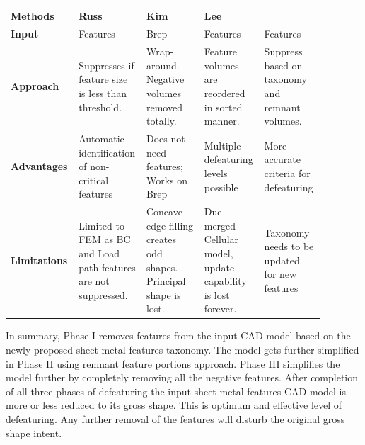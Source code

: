\bigskip
\begin{minipage}[t]{0.9\linewidth}
  \centering
  \label{tbl:defeaturing:benchmarking}
\begin{longtable}[htp]{@{} p{0.16\linewidth} |p{0.18\linewidth} | p{0.18\linewidth}| p{0.18\linewidth} |p{0.18\linewidth}@{}}
\toprule
\textbf{Methods} & \textbf{Russ~\cite{Russ2012}} &	\textbf{Kim~\cite{Kim2005}} &	\textbf{Lee~\cite{Lee2005}} & \textbf{\mysystemname}\\
\midrule
\textbf{Input} & Features	& Brep	& Features	& Features\\
\midrule
\textbf{Approach} & Suppresses if feature size is less than threshold.&
Wrap-around. Negative volumes removed totally. &
Feature volumes are reordered in sorted manner.&
Suppress based on taxonomy and remnant volumes.\\
\midrule
\textbf{Advantages} & Automatic identification of non-critical features &
 Does not need features; Works on Brep&
 Multiple defeaturing levels possible& More accurate criteria for defeaturing
\\
\midrule
\textbf{Limitations} & Limited to FEM as BC and Load path features are not suppressed. &
Concave edge filling creates odd shapes. Principal shape is lost. &
Due merged Cellular model, update capability is lost forever. &
Taxonomy needs to be updated for new features\\	
\bottomrule
\end{longtable}

\end{minipage}


\bigskip


In summary, Phase I removes features from the input CAD model based on the newly proposed sheet metal features taxonomy. The model gets further simplified in Phase II using remnant feature portions approach. Phase III simplifies the model further by completely removing all the negative features. After completion of all three phases of defeaturing the input sheet metal features CAD model is more or less reduced to its gross shape. This is optimum and effective level of defeaturing. Any further removal of the features will disturb the original gross shape intent.

